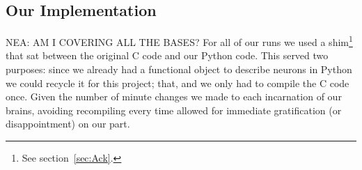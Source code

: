 \subsection{Our Implementation}
{\Large NEA: AM I COVERING ALL THE BASES?}
For all of our runs we used a shim\footnote{See section~\ref{sec:Ack}.} that 
sat between the original C code and our Python code. This served two purposes:
since we already had a functional object to describe neurons in Python we could
recycle it for this project; that, and we only had to compile the C code once.
Given the number of minute changes we made to each incarnation of our brains,
avoiding recompiling every time allowed for immediate gratification (or 
disappointment) on our part.

